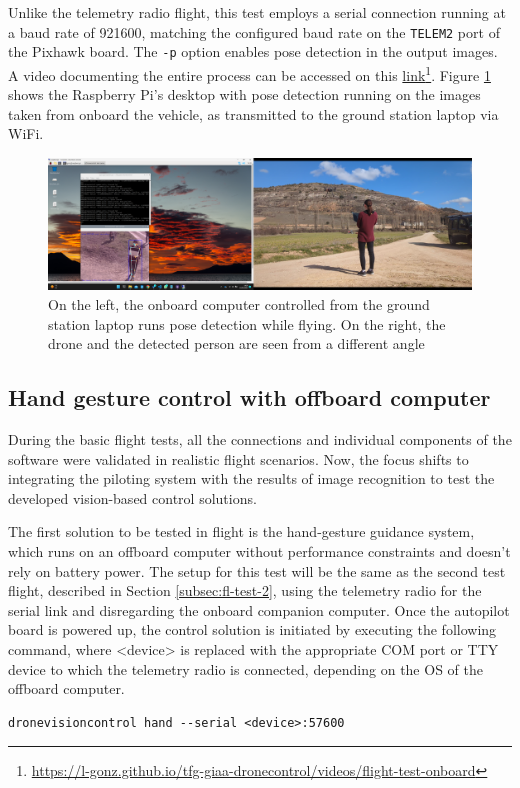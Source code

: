 Unlike the telemetry radio flight, this test employs a serial connection running at a baud rate of 921600, matching the configured baud rate on the \texttt{TELEM2} port of the Pixhawk board. The \texttt{-p} option enables pose detection in the output images. A video documenting the entire process can be accessed on this \href{https://l-gonz.github.io/tfg-giaa-dronecontrol/videos/flight-test-onboard}{link}\footnote{\url{https://l-gonz.github.io/tfg-giaa-dronecontrol/videos/flight-test-onboard}}. Figure \ref{fig:flight-test-cam-onboard} shows the Raspberry Pi's desktop with pose detection running on the images taken from onboard the vehicle, as transmitted to the ground station laptop via WiFi.


\begin{figure}[H]
  \centering
  \includegraphics[width=\textwidth, keepaspectratio]{img/video-field-test-onboard.png}
  \caption{On the left, the onboard computer controlled from the ground station laptop runs pose detection while flying. On the right, the drone and the detected person are seen from a different angle}
  \label{fig:flight-test-cam-onboard}
\end{figure}


\subsection{Hand gesture control with offboard computer}
\label{subsec:fl-test-4}


During the basic flight tests, all the connections and individual components of the software were validated in realistic flight scenarios. Now, the focus shifts to integrating the piloting system with the results of image recognition to test the developed vision-based control solutions.

The first solution to be tested in flight is the hand-gesture guidance system, which runs on an offboard computer without performance constraints and doesn't rely on battery power. The setup for this test will be the same as the second test flight, described in Section \ref{subsec:fl-test-2}, using the telemetry radio for the serial link and disregarding the onboard companion computer. Once the autopilot board is powered up, the control solution is initiated by executing the following command, where <device> is replaced with the appropriate COM port or TTY device to which the telemetry radio is connected, depending on the OS of the offboard computer.
\begin{verbatim}
dronevisioncontrol hand --serial <device>:57600
\end{verbatim}


